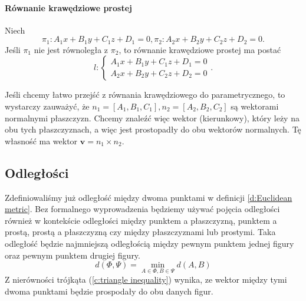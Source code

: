 \paragraph{Równanie krawędziowe prostej} Niech
\[ \pi_1 : A_1x + B_1y + C_1z + D_1 = 0, \pi_2 : A_2x + B_2y + C_2z + D_2 = 0. \]
Jeśli $\pi_1$ nie jest równoległa z $\pi_2$, to równanie krawędziowe prostej ma postać
\begin{equation}
    l : \begin{cases}
        A_1x + B_1y + C_1z + D_1 = 0 \\
        A_2x + B_2y + C_2z + D_2 = 0
    \end{cases}.
\end{equation}

\begin{remark*}
    Jeśli chcemy łatwo przejść z równania krawędziowego do parametrycznego, to wystarczy zauważyć, że $n_1 = [A_1, B_1, C_1], n_2 = [A_2, B_2, C_2]$ są wektorami normalnymi płaszczyzn. Chcemy znaleźć więc wektor (kierunkowy), który leży na obu tych płaszczyznach, a więc jest prostopadły do obu wektorów normalnych. Tę własność ma wektor $\mathbf{v} = n_1 \times n_2$.
\end{remark*}

\subsection{Odległości}
Zdefiniowaliśmy już odległość między dwoma punktami w definicji \ref{d:Euclidean metric}. Bez formalnego wyprowadzenia będziemy używać pojęcia odległości również w kontekście odległości między punktem a płaszczyzną, punktem a prostą, prostą a płaszczyzną czy między płaszczyznami lub prostymi. Taka odległość będzie najmniejszą odległością między pewnym punktem jednej figury oraz pewnym punktem drugiej figury.
\[ d(\Phi, \Psi) = \min_{A \in \Phi, B \in \Psi} d(A, B) \]
Z nierówności trójkąta (\ref{c:triangle inequality}) wynika, ze wektor między tymi dwoma punktami będzie prospodały do obu danych figur.

